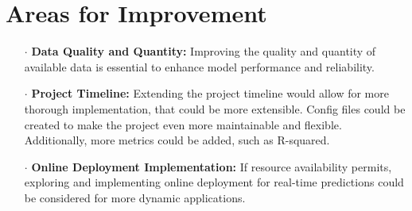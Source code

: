 \documentclass{report}
\begin{document}
\section{Areas for Improvement}
\begin{itemize}
  \item[$\cdot$] \textbf{Data Quality and Quantity:} Improving the quality and quantity of available data is essential to enhance model performance and reliability.
  
  \item[$\cdot$] \textbf{Project Timeline:} Extending the project timeline would allow for more thorough implementation, that could be more extensible. Config files could be created to make the project even more maintainable and flexible. Additionally, more metrics could be added, such as R-squared.
  
  \item[$\cdot$] \textbf{Online Deployment Implementation:} If resource availability permits, exploring and implementing online deployment for real-time predictions could be considered for more dynamic applications.
\end{itemize}
\end{document}
